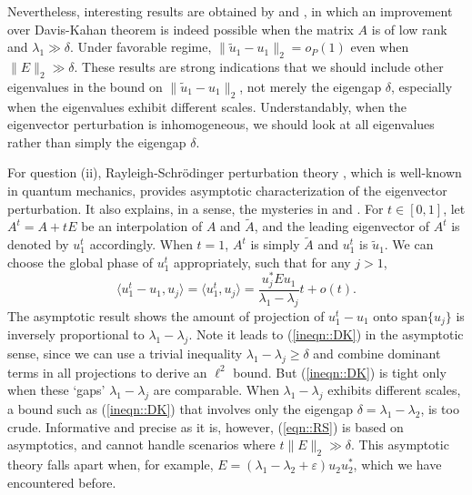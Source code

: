 \documentclass[12pt]{article}%
\theoremstyle{plain}%
\theoremstyle{remark}
\begin{document}

Nevertheless, interesting results are obtained by \cite{Vu11} and \cite{ORVuWan13}, in which an improvement over Davis-Kahan theorem is indeed possible when the matrix $A$ is of low rank and $\lambda_1 \gg \delta$. Under favorable regime, $\| \tilde{u}_1 - u_1\|_2 = o_P(1)$ even when $\| E \|_2 \gg \delta$.   These results are strong indications that we should include other eigenvalues in the bound on $\| \tilde{u}_1 - u_1\|_2$, not merely the eigengap $\delta$, especially when the eigenvalues exhibit different scales. Understandably, when the eigenvector perturbation is inhomogeneous,
we should look at all eigenvalues rather than simply the eigengap $\delta$. 

For question (ii), Rayleigh-Schr\"{o}dinger perturbation theory \citep{Ray96, Sch26}, which is well-known in quantum mechanics, provides asymptotic characterization of the eigenvector perturbation. It also explains, in a sense, the mysteries in \cite{Vu11} and \cite{ORVuWan13}. For $t \in [0,1]$, let $A^t = A + t E$ be an interpolation of $A$ and $\tilde{A}$, and the leading eigenvector of $A^t$ is denoted by $u^{t}_1$ accordingly. When $t=1$, $A^t$ is simply $\tilde{A}$ and $u^{t}_1$ is $\tilde{u}_1$. We can choose the global phase of $u_1^t$ appropriately, such that for any $j > 1$, 
\begin{equation}\label{eqn::RS}
\langle u^t_1 - u_1, u_j \rangle = \langle u^t_1, u_j \rangle = \frac{u_j^* E u_1}{\lambda_1 - \lambda_j} t + o(t).
\end{equation}
The asymptotic result shows the amount of projection of $u^t_1 - u_1$ onto $\mathrm{span}\{u_j\}$ is inversely proportional to $\lambda_1 - \lambda_j$.  Note it leads to (\ref{ineqn::DK}) in the asymptotic sense, since we can use a trivial inequality $\lambda_1 - \lambda_j \ge \delta$ and combine dominant terms in all projections to derive an $\ell^2$ bound. But (\ref{ineqn::DK}) is tight only when these `gaps' $\lambda_1 - \lambda_j$ are comparable. When $\lambda_1 - \lambda_j$ exhibits different scales, a bound such as (\ref{ineqn::DK}) that involves only the eigengap $\delta = \lambda_1 - \lambda_2$, is too crude. Informative and precise as it is, however, (\ref{eqn::RS}) is based on asymptotics, and cannot handle scenarios where $t \| E \|_2 \gg \delta$. This asymptotic theory falls apart when, for example, $E = (\lambda_1 - \lambda_2 + \varepsilon) u_2 u_2^*$, which we have encountered before.
\end{document}
